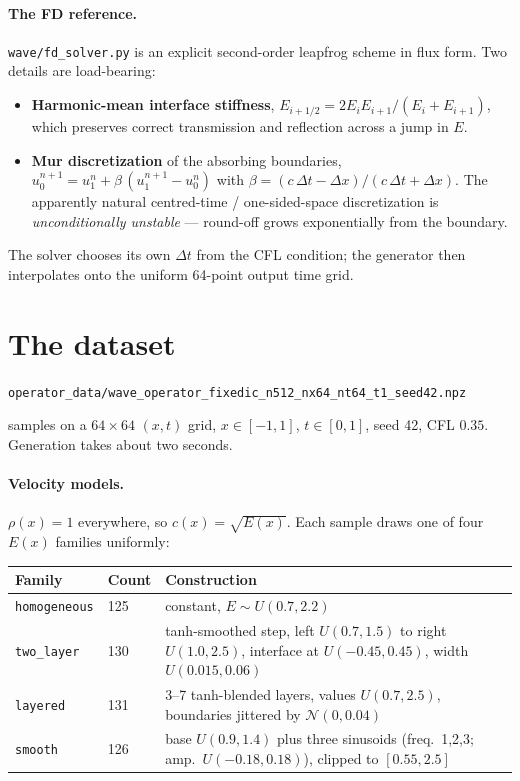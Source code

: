 \documentclass[11pt,a4paper]{article}
\newcommand{\bk}{\discretionary{}{}{}}
\begin{document}
\paragraph{The FD reference.} \texttt{wave/fd\_solver.py} is an explicit
second-order leapfrog scheme in flux form. Two details are load-bearing:

\begin{itemize}[leftmargin=*,itemsep=2pt]
\item \textbf{Harmonic-mean interface stiffness},
$E_{i+1/2} = 2E_iE_{i+1}/(E_i+E_{i+1})$, which preserves correct transmission
and reflection across a jump in $E$.
\item \textbf{Mur discretization} of the absorbing boundaries,
$u_0^{n+1}=u_1^{n}+\beta\,(u_1^{n+1}-u_0^{n})$ with
$\beta=(c\,\Delta t-\Delta x)/(c\,\Delta t+\Delta x)$. The apparently natural
centred-time / one-sided-space discretization is \emph{unconditionally
unstable} --- round-off grows exponentially from the boundary.
\end{itemize}

The solver chooses its own $\Delta t$ from the CFL condition; the generator then
interpolates onto the uniform 64-point output time grid.

\section{The dataset}

\texttt{operator\_data/\bk wave\_operator\bk\_fixedic\bk\_n512\bk\_nx64\bk\_nt64\bk\_t1\bk\_seed42.npz}

\medskip{} samples on a $64\times64$ $(x,t)$ grid, $x\in[-1,1]$, $t\in[0,1]$, seed 42,
CFL $0.35$. Generation takes about two seconds.

\paragraph{Velocity models.} $\rho(x)=1$ everywhere, so $c(x)=\sqrt{E(x)}$. Each
sample draws one of four $E(x)$ families uniformly:

\begin{center}
\small
\begin{tabular}{llp{9.2cm}}
\toprule
\textbf{Family} & \textbf{Count} & \textbf{Construction}\\
\midrule
\texttt{homogeneous} & 125 & constant, $E\sim U(0.7,2.2)$\\
\texttt{two\_layer}  & 130 & tanh-smoothed step, left $U(0.7,1.5)$ to right $U(1.0,2.5)$, interface at $U(-0.45,0.45)$, width $U(0.015,0.06)$\\
\texttt{layered}     & 131 & 3--7 tanh-blended layers, values $U(0.7,2.5)$, boundaries jittered by $\mathcal{N}(0,0.04)$\\
\texttt{smooth}      & 126 & base $U(0.9,1.4)$ plus three sinusoids (freq.\ 1,2,3; amp.\ $U(-0.18,0.18)$), clipped to $[0.55,2.5]$\\
\bottomrule
\end{tabular}
\end{center}
\end{document}
